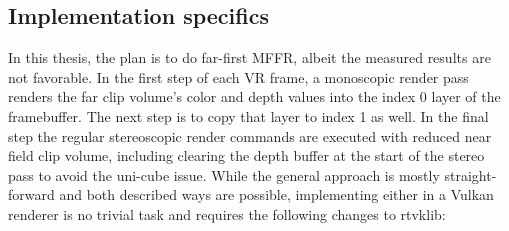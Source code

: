 \subsection{Implementation specifics}
In this thesis, the plan is to do far-first \gls{MFFR}, albeit the measured results are not favorable. In the first step of each \gls{VR} frame, a monoscopic render pass renders the far clip volume's color and depth values into the index 0 layer of the framebuffer. The next step is to copy that layer to index 1 as well. In the final step the regular stereoscopic render commands are executed with reduced near field clip volume, including clearing the depth buffer at the start of the stereo pass to avoid the uni-cube issue. 
While the general approach is mostly straight-forward and both described ways are possible, implementing either in a Vulkan renderer is no trivial task and requires the following changes to \gls{rtvklib}: 
